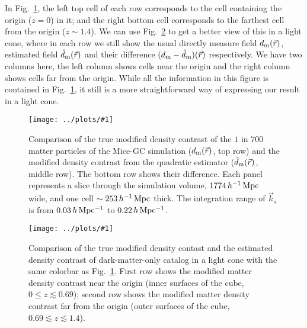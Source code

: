 \documentclass[prd,amsmath,amssymb,floatfix,superscriptaddress,nofootinbib,twocolumn]{revtex4-1}
\newcommand{\vrr}{\vec{r}}
\newcommand{\vk}{\vec{k}}
\newcommand{\rf}[1]{\ref{fig:#1}}
\newcommand{\sfig}[2]{
\texttt{[image: ../plots/\#1]}
        }
\newcommand{\Sfig}[2]{
   \begin{figure}[thbp]
   \begin{center}
    \sfig{../plots/#1.pdf}{\columnwidth}
    \caption{{\small #2}}
    \label{fig:#1}
     \end{center}
   \end{figure}
}
\begin{document}
In Fig.~\rf{real_dm}, the left top cell of each row corresponds to the cell containing the origin ($z=0$) in it; and the right bottom cell corresponds to the farthest cell from the origin ($z\sim 1.4$). We can use Fig.~\rf{cube_dm} to get a better view of this in a light cone, where in each row we still show the usual directly measure field $d_{\rm m}(\vrr)$, estimated field $\hat{d}_{\rm m}(\vrr)$ and their difference $(d_{\rm m}-\hat{d}_{\rm m})(\vrr)$ respectively. We have two columns here, the left column shows cells near the origin and the right column shows cells far from the origin. While all the information in this figure is contained in Fig.~\rf{real_dm}, it still is a more straightforward way of expressing our result in a light cone. 


\Sfig{real_dm}{Comparison of the true modified density contrast of the $1$ in $700$ matter particles of the Mice-GC simulation ($d_{\rm m}(\vrr)$, top row) and the modified density contrast from the quadratic estimator ($\hat{d}_{\rm m}(\vrr)$, middle row). The bottom row shows their difference. Each panel represents a slice through the simulation volume, $1774\,h^{-1}\rm \, Mpc$ wide, and one cell $\sim 253\,h^{-1}\rm \, Mpc$ thick. The integration range of $\vk_{s}$ is from $0.03\, h \rm \, Mpc^{-1}$ to $0.22\, h \rm \, Mpc^{-1}$.}
\Sfig{cube_dm}{Comparison of the true modified density contast and the estimated density contrast of dark-matter-only catalog in a light cone with the same colorbar as Fig.~\rf{real_dm}. First row shows the modified matter density contrast near the origin (inner surfaces of the cube, $0\leqslant z \lesssim 0.69$); second row shows the modified matter density contrast far from the origin (outer surfaces of the cube, $0.69\lesssim z \lesssim 1.4$).}
\end{document}

